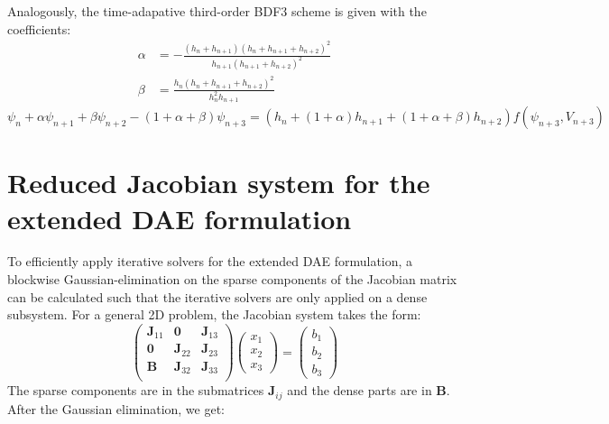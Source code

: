 Analogously, the time-adapative third-order BDF3 scheme is given with the coefficients: 
\begin{align}
\alpha &= -\frac{\left(h_n+h_{n+1}\right)\left(h_n+h_{n+1}+h_{n+2}\right)^2}
{h_{n+1}\left(h_{n+1}+h_{n+2}\right)^2} \\
\beta &= \frac{h_n\left(h_n+h_{n+1}+h_{n+2}\right)^2}
{h_{n}^2h_{n+1}}
\end{align}
\begin{equation}
\label{eq:BDF_coeffs_3rd_order}
\psi_n + \alpha \psi_{n+1} + \beta \psi_{n+2} -(1+\alpha+\beta)\psi_{n+3} = \left(h_n + (1+\alpha)h_{n+1} + (1+\alpha+\beta)h_{n+2}\right)f(\psi_{n+3},V_{n+3})
\end{equation}

\chapter{Reduced Jacobian system for the extended DAE formulation}
\label{apx:ReducedJacobianExtendedDAE}
To efficiently apply iterative solvers for the extended DAE formulation, a blockwise Gaussian-elimination on the sparse components of the Jacobian matrix can be calculated such that the iterative solvers are only applied on a dense subsystem. For a general 2D problem, the Jacobian system takes the form: 
\begin{equation}
\begin{pmatrix}
\mathbf{J}_{11} & \mathbf{0}      & \mathbf{J}_{13} \\
\mathbf{0}        & \mathbf{J}_{22} & \mathbf{J}_{23}   \\
\mathbf{B}      & \mathbf{J}_{32} & \mathbf{J}_{33}   \\
\end{pmatrix}\begin{pmatrix}
x_1 \\ x_2 \\ x_3 
\end{pmatrix} = \begin{pmatrix}
b_1 \\ b_2 \\ b_3 
\end{pmatrix}
\end{equation}
The sparse components are in the submatrices $\mathbf{J}_{ij}$ and the dense parts are in $\mathbf{B}$. After the Gaussian elimination, we get:
